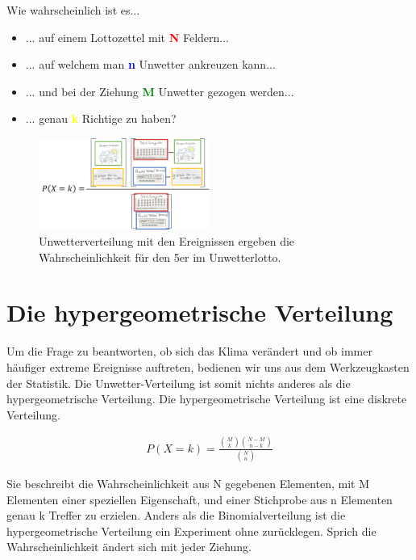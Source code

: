 \begin{refsection}
Wie wahrscheinlich ist es...

\begin{itemize}
\item ... auf einem Lottozettel mit \textcolor{red}{\textbf{N}} Feldern...
\item ... auf welchem man \textcolor{blue}{\textbf{n}} Unwetter ankreuzen kann...
\item ... und bei der Ziehung \textcolor{green}{\textbf{M}} Unwetter gezogen werden...
\item ... genau \textcolor{yellow}{\textbf{k}} Richtige zu haben?
\end{itemize}


\begin{figure}[htbp]
\centering
\includegraphics[width=0.5\textwidth]{extrem/Unwettervert.pdf}
\caption{Unwetterverteilung mit den Ereignissen ergeben die Wahrscheinlichkeit für den 5er im Unwetterlotto.}
\label{UnwetterVerteilung}
\end{figure}

\section{Die hypergeometrische Verteilung}
Um die Frage zu beantworten, ob sich das Klima verändert und ob immer häufiger extreme Ereignisse auftreten, bedienen wir uns aus dem Werkzeugkasten der Statistik. Die Unwetter-Verteilung ist somit nichts anderes als die hypergeometrische Verteilung. Die hypergeometrische Verteilung ist eine diskrete Verteilung.

\begin{align*}
P(X = k) = 
\frac{ \binom{M}{k} \binom{N-M}{n-k}}{ \binom{N}{n} }
\end{align*}

Sie beschreibt die Wahrscheinlichkeit aus N gegebenen Elementen, mit M Elementen einer speziellen Eigenschaft, und einer Stichprobe aus n Elementen genau k Treffer zu erzielen. 
Anders als die Binomialverteilung ist die hypergeometrische Verteilung ein Experiment ohne zurücklegen. Sprich die Wahrscheinlichkeit ändert sich mit jeder Ziehung.




\end{refsection}

